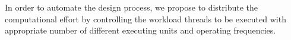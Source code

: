 \documentclass[journal]{IEEEtran}
\begin{document}
In order to automate the design process, we propose to distribute the computational effort by controlling the workload threads to be executed with appropriate number of different executing units and operating frequencies.

 

\end{document}
